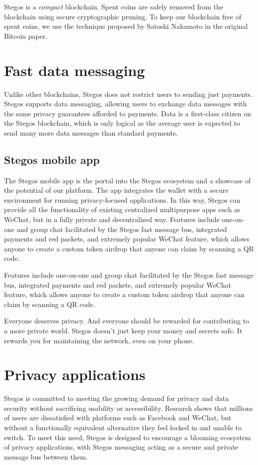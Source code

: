 \documentclass[8pt,fleqn,openany]{book}
\begin{document}
Stegos is a \textit{compact} blockchain. Spent coins are safely removed from the blockchain using secure cryptographic pruning. To keep our blockchain free of spent coins, we use the technique proposed by Satoshi Nakamoto in the original Bitcoin paper\cite{c1}.

\section{Fast data messaging}
Unlike other blockchains, Stegos does not restrict users to sending just payments. Stegos supports data messaging, allowing users to exchange data messages with the same privacy guarantees afforded to payments. Data is a first-class citizen on the Stegos blockchain, which is only logical as the average user is expected to send many more data messages than standard payments.

\subsection{Stegos mobile app}
The Stegos mobile app is the portal into the Stegos ecosystem and a showcase of the potential of our platform. The app integrates the wallet with a secure environment for running privacy-focused applications. In this way, Stegos can provide all the functionality of existing centralized multipurpose apps such as WeChat, but in a fully private and decentralized way. Features include one-on-one and group chat facilitated by the Stegos fast message bus, integrated payments and red packets, and extremely popular WeChat feature, which allows anyone to create a custom token airdrop that anyone can claim by scanning a QR code.

Features include one-on-one and group chat facilitated by the Stegos fast message bus, integrated payments and red packets, and extremely popular WeChat feature, which allows anyone to create a custom token airdrop that anyone can claim by scanning a QR code.

Everyone deserves privacy. And everyone should be rewarded for contributing to a more private world. Stegos doesn’t just keep your money and secrets safe. It rewards you for maintaining the network, even on your phone.

\section{Privacy applications}
Stegos is committed to meeting the growing demand for privacy and data security without sacrificing usability or accessibility. Research shows that millions of users are dissatisfied with platforms such as Facebook and WeChat, but without a functionally equivalent alternative they feel locked in and unable to switch. To meet this need, Stegos is designed to encourage a blooming ecosystem of privacy applications, with Stegos messaging acting as a secure and private message bus between them.      
\end{document}
